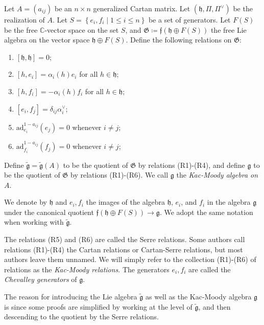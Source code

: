 \documentclass[11pt, letterpaper]{article}
\theoremstyle{plain}
\begin{document}
\begin{construction}\label{const:3-5}
	Let $A=(a_{ij} )$ be an $n\times n$ generalized Cartan matrix. Let $(\mathfrak{h} ,\Pi ,\Pi ^\vee )$ be the realization of $A$. Let $S=\left\{ e_i,f_i\mid 1\leq i\leq n \right\} $ be a set of generators. Let $F(S)$ be the free $\mathbb{C} $-vector space on the set $S$, and $\mathfrak{G} \coloneqq \mathfrak{f} (\mathfrak{h} \oplus F(S))$ the free Lie algebra on the vector space $\mathfrak{h} \oplus F(S)$. Define the following relations on $\mathfrak{G} $:
	\begin{enumerate}[label=(R\arabic*), align=left]
		\item $[\mathfrak{h},\mathfrak{h}]=0$;
		\item $[h,e_i]=\alpha _i(h)e_i$ for all $h\in \mathfrak{h} $;
		\item $[h,f_i]=-\alpha _i(h)f_i$ for all $h\in \mathfrak{h} $;
		\item $[e_i,f_j]=\delta _{ij} \alpha _i^\vee $;
		\item $\mathrm{ad}_{e_i} ^{1-a_{ij} } (e_j)=0$ whenever $i\neq j$;
		\item $\mathrm{ad}_{f_i} ^{1-a_{ij} } (f_j)=0$ whenever $i\neq j$;
	\end{enumerate}
	Define $\widetilde{\mathfrak{g} }=\widetilde{\mathfrak{g} } (A)$ to be the quotient of $\mathfrak{G} $ by relations (R1)-(R4), and define $\mathfrak{g}$ to be the quotient of $\mathfrak{G} $ by relations (R1)-(R6). We call $\mathfrak{g}$ the \emph{Kac-Moody algebra on $A$}.
\end{construction}

We denote by $\mathfrak{h} $ and $e_i,f_i$ the images of the algebra $\mathfrak{h} $, $e_i$, and $f_i$ in the algebra $\mathfrak{g} $ under the canonical quotient $\mathfrak{f} (\mathfrak{h} \oplus F(S)) \to \mathfrak{g} $. We adopt the same notation when working with $\widetilde{\mathfrak{g} } $.

The relations (R5) and (R6) are called the Serre relations. Some authors call relations (R1)-(R4) the Cartan relations or Cartan-Serre relations, but most authors leave them unnamed. We will simply refer to the collection (R1)-(R6) of relations as the \emph{Kac-Moody relations}. The generators $e_i,f_i$ are called the \emph{Chevalley generators} of $\mathfrak{g}$.

The reason for introducing the Lie algebra $\widetilde{\mathfrak{g} }$ as well as the Kac-Moody algebra $\mathfrak{g}$ is since some proofs are simplified by working at the level of $\widetilde{\mathfrak{g} }$, and then descending to the quotient by the Serre relations.
\end{document}
